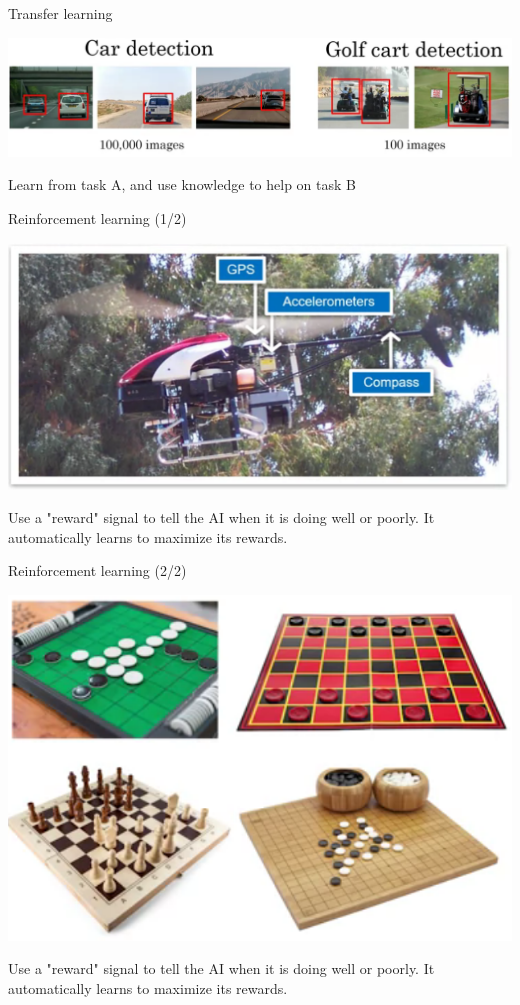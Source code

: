 \documentclass[pdf]{beamer}
\theoremstyle{mystyle}
\begin{document}
\begin{frame}{Transfer learning}
	\begin{center}
		\includegraphics[scale=.225]{transfer-learning}
	\end{center}
	\begin{center}
	Learn from task A, and use knowledge to help on task B	
	\end{center}	
\end{frame}

\begin{frame}{Reinforcement learning (1/2)}
	\begin{center}
		\includegraphics[scale=.325]{reinforcement-learning}
	\end{center}
	Use a "reward" signal to tell the AI when it is doing well or poorly. It automatically learns to maximize its rewards.
\end{frame}

\begin{frame}{Reinforcement learning (2/2)}
	\begin{center}
		\includegraphics[scale=.325]{reinforcement-learning-2}
	\end{center}
	Use a "reward" signal to tell the AI when it is doing well or poorly. It automatically learns to maximize its rewards.
\end{frame}
\end{document}
